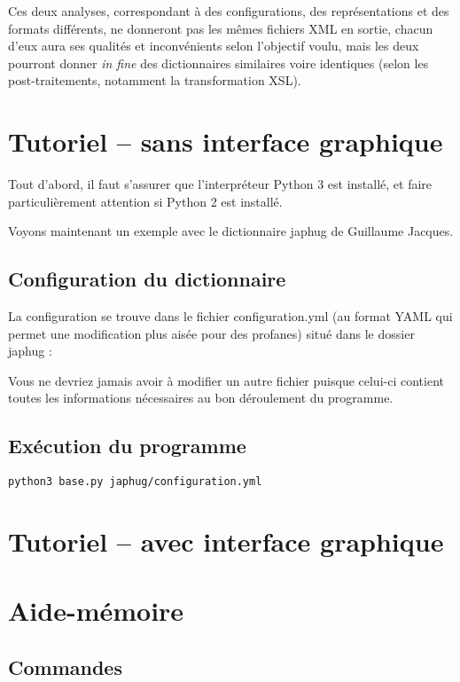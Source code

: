 \documentclass[10pt]{report}
\begin{document}
Ces deux analyses, correspondant à des configurations, des représentations et des formats différents, ne donneront pas les mêmes fichiers XML en sortie, chacun d’eux aura ses qualités et inconvénients selon l’objectif voulu, mais les deux pourront donner \textit{in fine} des dictionnaires similaires voire identiques (selon les post-traitements, notamment la transformation XSL).

 
\chapter{Tutoriel -- sans interface graphique}

Tout d’abord, il faut s’assurer que l’interpréteur Python 3 est installé, et faire particulièrement attention si Python 2 est installé.

Voyons maintenant un exemple avec le dictionnaire japhug de Guillaume Jacques.

\section{Configuration du dictionnaire}

La configuration se trouve dans le fichier configuration.yml (au format YAML qui permet une modification plus aisée pour des profanes) situé dans le dossier japhug :

Vous ne devriez jamais avoir à modifier un autre fichier puisque celui-ci contient toutes les informations nécessaires au bon déroulement du programme.

\section{Exécution du programme}

\begin{verbatim}
python3 base.py japhug/configuration.yml
\end{verbatim}


\chapter{Tutoriel -- avec interface graphique}

\chapter{Aide-mémoire}

\section{Commandes}
\end{document}

